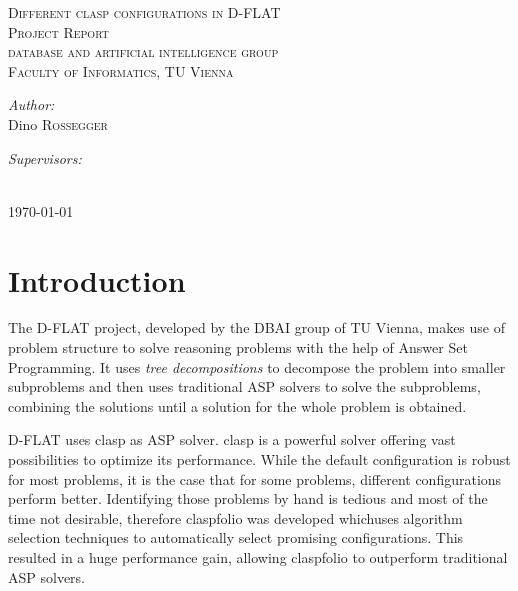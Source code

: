 

\begin{titlepage}
\center
\textsc{\LARGE{Different clasp configurations in D-FLAT}}\\[1.5cm]
\textsc{\large{Project Report}}\\[1cm]
\textsc{\large{database and artificial intelligence group}}\\
\textsc{\large{Faculty of Informatics, TU Vienna}}\\[1.5cm]
\begin{minipage}{0.4\textwidth}
	\begin{flushleft} \large
		\emph{Author:}\\
		Dino \textsc{Rossegger} %
	\end{flushleft}
\end{minipage}
\begin{minipage}{0.4\textwidth}
	\begin{flushright} \large
		\emph{Supervisors:} \\
	\end{flushright}
\end{minipage}\\[4cm]
{\large \today}\\[2cm]
\end{titlepage}

\section{Introduction}
The D-FLAT project, developed by the DBAI group of TU Vienna, makes use of problem structure to solve reasoning problems with the help of Answer Set Programming.
It uses \emph{tree decompositions} to decompose the problem into smaller subproblems and then uses traditional ASP solvers to solve the subproblems, combining the solutions until a solution for the whole problem is obtained.

D-FLAT uses clasp as ASP solver. clasp is a powerful solver offering vast possibilities to optimize its performance. While the default configuration is robust for most problems, it is the case that for some problems, different configurations perform better. Identifying those problems by hand is tedious and most of the time not desirable, therefore claspfolio was developed whichuses algorithm selection techniques to automatically select promising configurations. This resulted in a huge performance gain, allowing claspfolio to outperform traditional ASP solvers.

